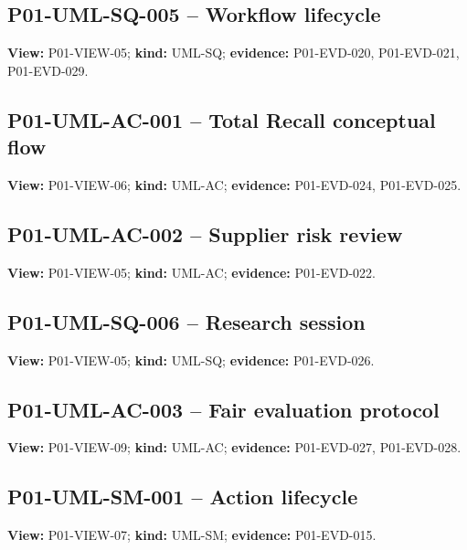 \documentclass[10pt,letterpaper]{article}
\begin{document}
\subsection{P01-UML-SQ-005 -- Workflow lifecycle}
\textbf{View:} P01-VIEW-05; \textbf{kind:} UML-SQ; \textbf{evidence:} P01-EVD-020, P01-EVD-021, P01-EVD-029.\par
{}
\clearpage

\subsection{P01-UML-AC-001 -- Total Recall conceptual flow}
\textbf{View:} P01-VIEW-06; \textbf{kind:} UML-AC; \textbf{evidence:} P01-EVD-024, P01-EVD-025.\par
{}
\clearpage

\subsection{P01-UML-AC-002 -- Supplier risk review}
\textbf{View:} P01-VIEW-05; \textbf{kind:} UML-AC; \textbf{evidence:} P01-EVD-022.\par
{}
\clearpage

\subsection{P01-UML-SQ-006 -- Research session}
\textbf{View:} P01-VIEW-05; \textbf{kind:} UML-SQ; \textbf{evidence:} P01-EVD-026.\par
{}
\clearpage

\subsection{P01-UML-AC-003 -- Fair evaluation protocol}
\textbf{View:} P01-VIEW-09; \textbf{kind:} UML-AC; \textbf{evidence:} P01-EVD-027, P01-EVD-028.\par
{}
\clearpage

\subsection{P01-UML-SM-001 -- Action lifecycle}
\textbf{View:} P01-VIEW-07; \textbf{kind:} UML-SM; \textbf{evidence:} P01-EVD-015.\par
{}
\clearpage
\end{document}
